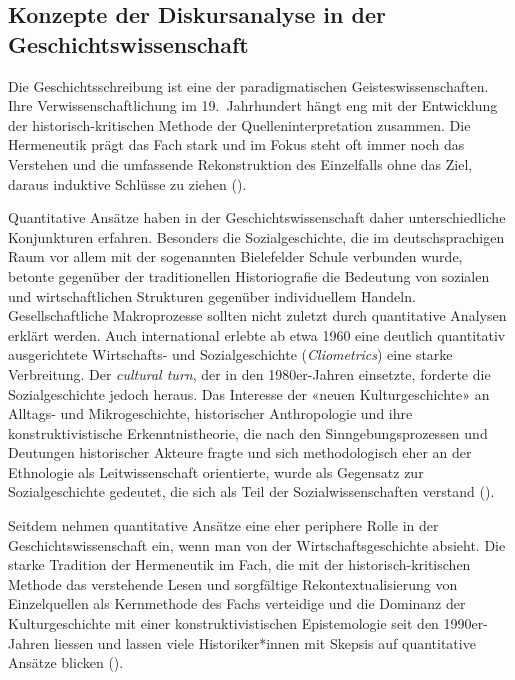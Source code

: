 \subsection{Konzepte der Diskursanalyse in der Geschichtswissenschaft}

Die Geschichtsschreibung ist eine der paradigmatischen Geisteswissenschaften. Ihre Verwissenschaftlichung im 19.~Jahrhundert hängt eng mit der Entwicklung der historisch-kritischen Methode der Quelleninterpretation zusammen. Die Hermeneutik prägt das Fach stark und im Fokus steht oft immer noch das Verstehen und die umfassende Rekonstruktion des Einzelfalls ohne das Ziel, daraus induktive Schlüsse zu ziehen (\cite{dilthey_aufbau_1992}).

Quantitative Ansätze haben in der Geschichtswissenschaft daher unterschiedliche Konjunkturen erfahren. Besonders die Sozialgeschichte, die im deutschsprachigen Raum vor allem mit der sogenannten Bielefelder Schule verbunden wurde, betonte gegenüber der traditionellen Historiografie die Bedeutung von sozialen und wirtschaftlichen Strukturen gegenüber individuellem Handeln. Gesellschaftliche Makroprozesse sollten nicht zuletzt durch quantitative Analysen erklärt werden. Auch international erlebte ab etwa 1960 eine deutlich quantitativ ausgerichtete Wirtschafts- und Sozialgeschichte (\textit{Cliometrics}) eine starke Verbreitung. Der \textit{cultural turn}, der in den 1980er-Jahren einsetzte, forderte die Sozialgeschichte jedoch heraus. Das Interesse der «neuen Kulturgeschichte» an Alltags- und Mikrogeschichte, historischer Anthropologie und ihre konstruktivistische Erkenntnistheorie, die nach den Sinngebungsprozessen und Deutungen historischer Akteure fragte und sich methodologisch eher an der Ethnologie als Leitwissenschaft orientierte, wurde als Gegensatz zur Sozialgeschichte gedeutet, die sich als Teil der Sozialwissenschaften verstand (\cite{nathaus_sozialgeschichte_2012}).

Seitdem nehmen quantitative Ansätze eine eher periphere Rolle in der Geschichtswissenschaft ein, wenn man von der Wirtschaftsgeschichte absieht. Die starke Tradition der Hermeneutik im Fach, die mit der historisch-kritischen Methode das verstehende Lesen und sorgfältige Rekontextualisierung von Einzelquellen als Kernmethode des Fachs verteidige und die Dominanz der Kulturgeschichte mit einer konstruktivistischen Epistemologie seit den 1990er-Jahren liessen und lassen viele Historiker*innen mit Skepsis auf quantitative Ansätze blicken (\cite[S.~A.1-21]{hohls_digital_2018}).

